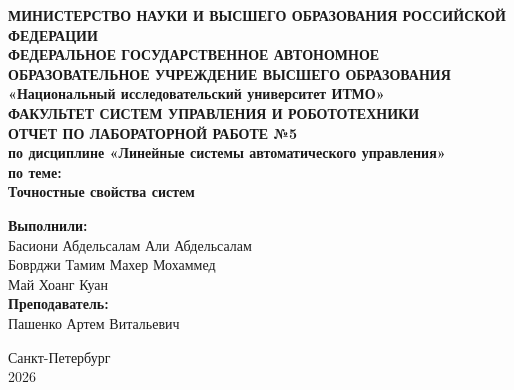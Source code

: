 \documentclass[12pt, a4paper]{article}
\begin{document}

\begin{titlepage}
    \begin{center}
        \textbf{МИНИСТЕРСТВО НАУКИ И ВЫСШЕГО ОБРАЗОВАНИЯ РОССИЙСКОЙ ФЕДЕРАЦИИ}
        \\
        \textbf{ФЕДЕРАЛЬНОЕ ГОСУДАРСТВЕННОЕ АВТОНОМНОЕ ОБРАЗОВАТЕЛЬНОЕ УЧРЕЖДЕНИЕ ВЫСШЕГО ОБРАЗОВАНИЯ}
        \\
        \textbf{«Национальный исследовательский университет ИТМО»}
        \\
        \vspace{0.5cm}
        \textbf{ФАКУЛЬТЕТ СИСТЕМ УПРАВЛЕНИЯ И РОБОТОТЕХНИКИ}
        \\
        \vspace{3cm}
        \textbf{\Large ОТЧЕТ ПО ЛАБОРАТОРНОЙ РАБОТЕ №5} \\
        \vspace{0.5cm}
        \textbf{\large по дисциплине «Линейные системы автоматического управления»} \\
        \vspace{2cm}
        \textbf{ по теме:}
        \\
        \vspace{0.5cm}
        \textbf{\Large Точностные свойства систем}
       
    \end{center}
    
    \vspace{3cm}
    
    \begin{flushright}
        \textbf{Выполнили:} \\
        Басиони Абдельсалам Али Абдельсалам\\
        Боврджи Тамим Махер Мохаммед\\
        Май Хоанг Куан \\
        
        
        \vspace{0.5cm}
        \textbf{Преподаватель:} \\
        Пашенко Артем Витальевич



    \end{flushright}
    
    \vfill
    
    \begin{center}
        Санкт-Петербург \\
        2026
    \end{center}
\end{titlepage}
\tableofcontents
\end{document}
